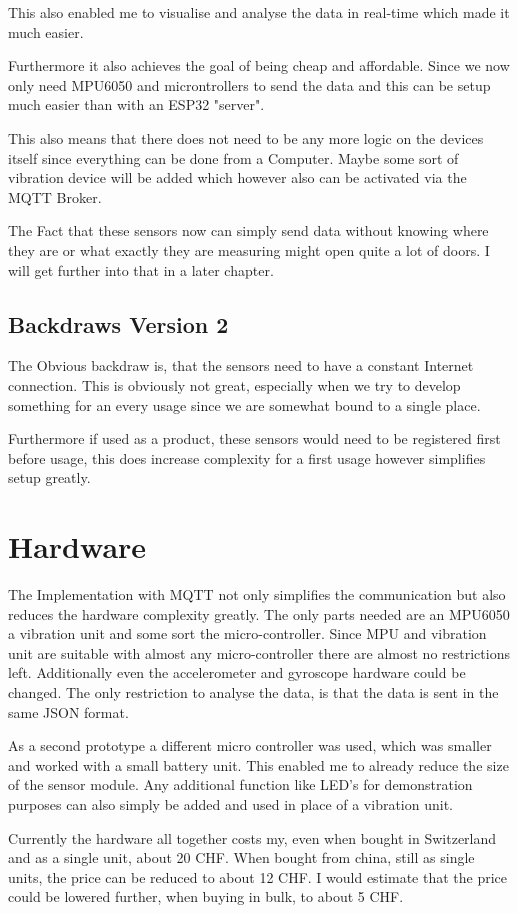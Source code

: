 This also enabled me to visualise and analyse the data in real-time which made it much easier. 

Furthermore it also achieves the goal of being cheap and affordable. Since we now only need MPU6050 and microntrollers to send the data and this can be setup much easier than with an ESP32 "server".

This also means that there does not need to be any more logic on the devices itself since everything can be done from a Computer. Maybe some sort of vibration device will be added which however also can be activated via the MQTT Broker. 

The Fact that these sensors now can simply send data without knowing where they are or what exactly they are measuring might open quite a lot of doors. I will get further into that in a later chapter.

\subsection{Backdraws Version 2}

The Obvious backdraw is, that the sensors need to have a constant Internet connection. This is obviously not great, especially when we try to develop something for an every usage since we are somewhat bound to a single place. 

Furthermore if used as a product, these sensors would need to be registered first before usage, this does increase complexity for a first usage however simplifies setup greatly.







\section{Hardware}

The Implementation with MQTT not only simplifies the communication but also reduces the hardware complexity greatly. The only parts needed are an MPU6050 a vibration unit and some sort the micro-controller. Since MPU and vibration unit are suitable with almost any micro-controller there are almost no restrictions left. Additionally even the accelerometer and gyroscope hardware could be changed. The only restriction to analyse the data, is that the data is sent in the same JSON format. 

As a second prototype a different micro controller was used, which was smaller and worked with a small battery unit. This enabled me to already reduce the size of the sensor module. Any additional function like LED's for demonstration purposes can also simply be added and used in place of a vibration unit.

Currently the hardware all together costs my, even when bought in Switzerland and as a single unit, about 20 CHF. When bought from china, still as single units, the price can be reduced to about 12 CHF. I would estimate that the price could be lowered further, when buying in bulk, to about 5 CHF.



